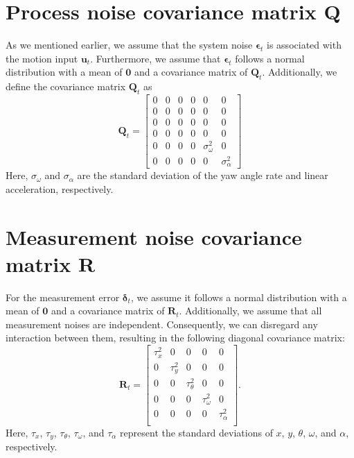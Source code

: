 \documentclass[12pt, a4paper]{article}
\begin{document}
\section{Process noise covariance matrix $\bm{Q}$}
As we mentioned earlier, we assume that the system noise $\bm{\epsilon}_{t}$ is associated with the motion input $\bm{u}_{t}$. Furthermore, we assume that $\bm{\epsilon}_{t}$ follows a normal distribution with a mean of $\bm{0}$ and a covariance matrix of $\bm{Q}_{t}$. Additionally, we define the covariance matrix $\bm{Q}_{t}$ as
\[
  \bm{Q}_{t}=\begin{bmatrix}
    0 & 0 & 0 & 0 & 0 & 0\\
    0 & 0 & 0 & 0 & 0 & 0\\
    0 & 0 & 0 & 0 & 0 & 0\\
    0 & 0 & 0 & 0 & 0 & 0\\
    0 & 0 & 0 & 0 &\sigma_{\omega}^{2} & 0\\
    0 & 0 & 0 & 0 &0 & \sigma_{\alpha}^{2}
  \end{bmatrix}
\]
Here, $\sigma_{\omega}$ and $\sigma_{\alpha}$ are the standard deviation of the yaw angle rate and linear acceleration, respectively. %

\section{Measurement noise covariance matrix $\bm{R}$}
For the measurement error $\bm{\delta}_{t}$, we assume it follows a normal distribution with a mean of $\bm{0}$ and a covariance matrix of $\bm{R}_{t}$. Additionally, we assume that all measurement noises are independent. Consequently, we can disregard any interaction between them, resulting in the following diagonal covariance matrix:
\[
  \bm{R}_{t} = \begin{bmatrix}
    \tau_{x}^2 & 0 & 0 & 0 & 0\\
    0 & \tau_{y}^2 & 0 & 0 & 0\\
    0 & 0 &\tau_{\theta}^2 & 0 & 0\\
    0 & 0 & 0 & \tau_{\omega}^2 & 0\\
    0 & 0 & 0 & 0 & \tau_{\alpha}^2\\
  \end{bmatrix}.
\]
Here, $\tau_{x}$, $\tau_{y}$, $\tau_{\theta}$, $\tau_{\omega}$, and $\tau_{\alpha}$ represent the standard deviations of $x$, $y$, $\theta$, $\omega$, and $\alpha$, respectively.
\end{document}
